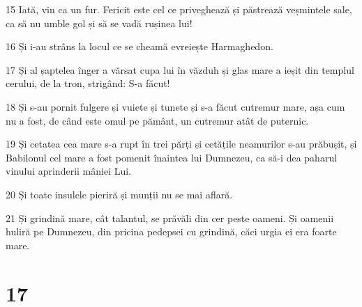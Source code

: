 \par 15 Iată, vin ca un fur. Fericit este cel ce priveghează și păstrează veșmintele sale, ca să nu umble gol și să se vadă rușinea lui!
\par 16 Și i-au strâns la locul ce se cheamă evreiește Harmaghedon.
\par 17 Și al șaptelea înger a vărsat cupa lui în văzduh și glas mare a ieșit din templul cerului, de la tron, strigând: S-a făcut!
\par 18 Și s-au pornit fulgere și vuiete și tunete și s-a făcut cutremur mare, așa cum nu a fost, de când este omul pe pământ, un cutremur atât de puternic.
\par 19 Și cetatea cea mare s-a rupt în trei părți și cetățile neamurilor s-au prăbușit, și Babilonul cel mare a fost pomenit înaintea lui Dumnezeu, ca să-i dea paharul vinului aprinderii mâniei Lui.
\par 20 Și toate insulele pieriră și munții nu se mai aflară.
\par 21 Și grindină mare, cât talantul, se prăvăli din cer peste oameni. Și oamenii huliră pe Dumnezeu, din pricina pedepsei cu grindină, căci urgia ei era foarte mare.

\chapter{17}

